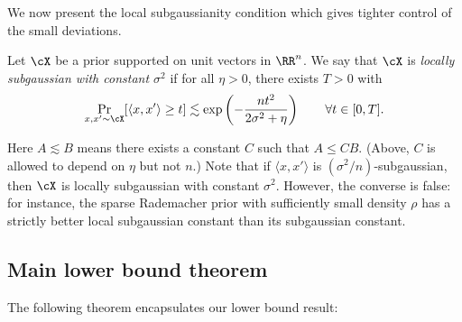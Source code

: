 \documentclass{article}
\begin{document}
We now present the local subgaussianity condition which gives tighter control of the small deviations.

\begin{definition}\label{def:locally-subg}
Let $\cX$ be a prior supported on unit vectors in $\RR^n$. We say that $\cX$ is \emph{locally subgaussian with constant $\sigma^2$} if for all $\eta > 0$, there exists $T > 0$ with
$$ \Pr_{x,x' \sim \cX}[\langle x,x' \rangle \ge t] \lesssim \exp\left( -\frac{n t^2}{2\sigma^2+\eta} \right) \qquad \forall t \in [0,T]. $$
\end{definition}
\noindent Here $A \lesssim B$ means there exists a constant $C$ such that $A \le CB$. (Above, $C$ is allowed to depend on $\eta$ but not $n$.) Note that if $\langle x,x' \rangle$ is $(\sigma^2/n)$-subgaussian, then $\cX$ is locally subgaussian with constant $\sigma^2$. However, the converse is false: for instance, the sparse Rademacher prior with sufficiently small density $\rho$ has a strictly better local subgaussian constant than its subgaussian constant.


\subsection{Main lower bound theorem}

The following theorem encapsulates our lower bound result:
\end{document}
